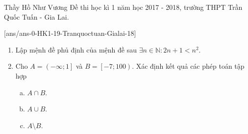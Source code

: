 
	\begin{name}
		{Thầy Hồ Như Vương}
		{Đề thi học kì 1 năm học 2017 - 2018, trường THPT Trần Quốc Tuấn - Gia Lai.}
	\end{name}
	\setcounter{ex}{0}\setcounter{bt}{0}
	[ans/ans-0-HK1-19-Tranquoctuan-Gialai-18]
\begin{bt}%
	\hfill
\begin{enumerate}[1)]
	\item Lập mệnh đề phủ định của mệnh đề sau $\exists n \in \mathbb{N}: 2n+1 < n^2$.
	\item %
		Cho $A=\left(-\infty;1\right]$ và $B=\left[-7;100\right)$. Xác định kết quả các phép toán tập hợp
	\begin{multicols}{3}
		\begin{enumerate}[a)]
			\item $A\cap B$.
			\item  $A\cup B$.
			\item $A\setminus  B$.
		\end{enumerate}
	\end{multicols}
\end{enumerate}
\end{bt}
